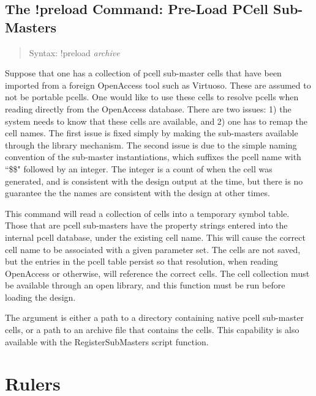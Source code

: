 \subsection{The {\cb !preload} Command: Pre-Load PCell Sub-Masters}
\begin{quote}
Syntax: {\vt !preload} {\it archive}
\end{quote}
Suppose that one has a collection of pcell sub-master {\Xic} cells
that have been imported from a foreign OpenAccess tool such as
Virtuoso.  These are assumed to not be portable pcells.  One would
like to use these cells to resolve pcells when reading directly from
the OpenAccess database.  There are two issues:  1) the system needs
to know that these cells are available, and 2) one has to remap the
cell names.  The first issue is fixed simply by making the sub-masters
available through the library mechanism.  The second issue is due to
the simple naming convention of the sub-master instantiations, which
suffixes the pcell name with ``{\vt \$\$}" followed by an integer. 
The integer is a count of when the cell was generated, and is
consistent with the design output at the time, but there is no
guarantee the the names are consistent with the design at other times.

This command will read a collection of cells into a temporary symbol
table.  Those that are pcell sub-masters have the property strings
entered into the internal pcell database, under the existing cell
name.  This will cause the correct cell name to be associated with a
given parameter set.  The cells are not saved, but the entries in the
pcell table persist so that resolution, when reading OpenAccess or
otherwise, will reference the correct cells.  The cell collection must
be available through an open library, and this function must be run
before loading the design.

The argument is either a path to a directory containing native pcell
sub-master cells, or a path to an archive file that contains the
cells.  This capability is also available with the {\vt
RegisterSubMasters} script function.

\section{Rulers}

